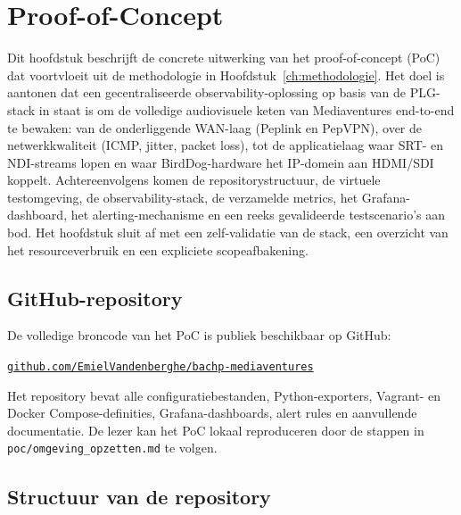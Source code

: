 ﻿%

\chapter{Proof-of-Concept}
\label{ch:poc}

Dit hoofdstuk beschrijft de concrete uitwerking van het proof-of-concept (PoC) dat voortvloeit uit de methodologie in Hoofdstuk~\ref{ch:methodologie}. Het doel is aantonen dat een gecentraliseerde observability-oplossing op basis van de PLG-stack in staat is om de volledige audiovisuele keten van Mediaventures end-to-end te bewaken: van de onderliggende WAN-laag (Peplink en PepVPN), over de netwerkkwaliteit (ICMP, jitter, packet loss), tot de applicatielaag waar SRT- en NDI-streams lopen en waar BirdDog-hardware het IP-domein aan HDMI/SDI koppelt. Achtereenvolgens komen de repositorystructuur, de virtuele testomgeving, de observability-stack, de verzamelde metrics, het Grafana-dashboard, het alerting-mechanisme en een reeks gevalideerde testscenario's aan bod. Het hoofdstuk sluit af met een zelf-validatie van de stack, een overzicht van het resourceverbruik en een expliciete scopeafbakening.

\section{GitHub-repository}
\label{sec:poc-github}

De volledige broncode van het PoC is publiek beschikbaar op GitHub:

\begin{center}
\href{https://github.com/EmielVandenberghe/bachp-mediaventures}{\texttt{github.com/EmielVandenberghe/bachp-mediaventures}}
\end{center}

Het repository bevat alle configuratiebestanden, Python-exporters, Vagrant- en Docker Compose-definities, Grafana-dashboards, alert rules en aanvullende documentatie. De lezer kan het PoC lokaal reproduceren door de stappen in \texttt{poc/omgeving\_opzetten.md} te volgen.

\section{Structuur van de repository}
\label{sec:poc-repo-structuur}

